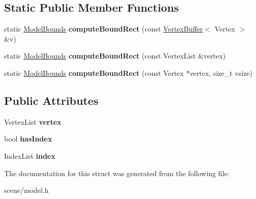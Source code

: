 \subsection*{Static Public Member Functions}
\begin{DoxyCompactItemize}
\item 
\hypertarget{struct_tempest_1_1_raw_model_aa86d1950c27dcaf7866ed59acb63c6b4}{static \hyperlink{struct_tempest_1_1_model_bounds}{Model\+Bounds} {\bfseries compute\+Bound\+Rect} (const \hyperlink{class_tempest_1_1_vertex_buffer}{Vertex\+Buffer}$<$ Vertex $>$ \&v)}\label{struct_tempest_1_1_raw_model_aa86d1950c27dcaf7866ed59acb63c6b4}

\item 
\hypertarget{struct_tempest_1_1_raw_model_a5f3d8c1c4a47a281f6a97bb4c0c6865a}{static \hyperlink{struct_tempest_1_1_model_bounds}{Model\+Bounds} {\bfseries compute\+Bound\+Rect} (const Vertex\+List \&vertex)}\label{struct_tempest_1_1_raw_model_a5f3d8c1c4a47a281f6a97bb4c0c6865a}

\item 
\hypertarget{struct_tempest_1_1_raw_model_a1eb5e52d29b3f609fd0da163edda0e02}{static \hyperlink{struct_tempest_1_1_model_bounds}{Model\+Bounds} {\bfseries compute\+Bound\+Rect} (const Vertex $\ast$vertex, size\+\_\+t vsize)}\label{struct_tempest_1_1_raw_model_a1eb5e52d29b3f609fd0da163edda0e02}

\end{DoxyCompactItemize}
\subsection*{Public Attributes}
\begin{DoxyCompactItemize}
\item 
\hypertarget{struct_tempest_1_1_raw_model_affff92b50950fa2105174f9dbe832a56}{Vertex\+List {\bfseries vertex}}\label{struct_tempest_1_1_raw_model_affff92b50950fa2105174f9dbe832a56}

\item 
\hypertarget{struct_tempest_1_1_raw_model_ac643df7fe248d09c0981f69610e55904}{bool {\bfseries has\+Index}}\label{struct_tempest_1_1_raw_model_ac643df7fe248d09c0981f69610e55904}

\item 
\hypertarget{struct_tempest_1_1_raw_model_ae8d86fdbb59d55f01613048c6e7f238c}{Index\+List {\bfseries index}}\label{struct_tempest_1_1_raw_model_ae8d86fdbb59d55f01613048c6e7f238c}

\end{DoxyCompactItemize}


The documentation for this struct was generated from the following file\+:\begin{DoxyCompactItemize}
\item 
scene/model.\+h\end{DoxyCompactItemize}
